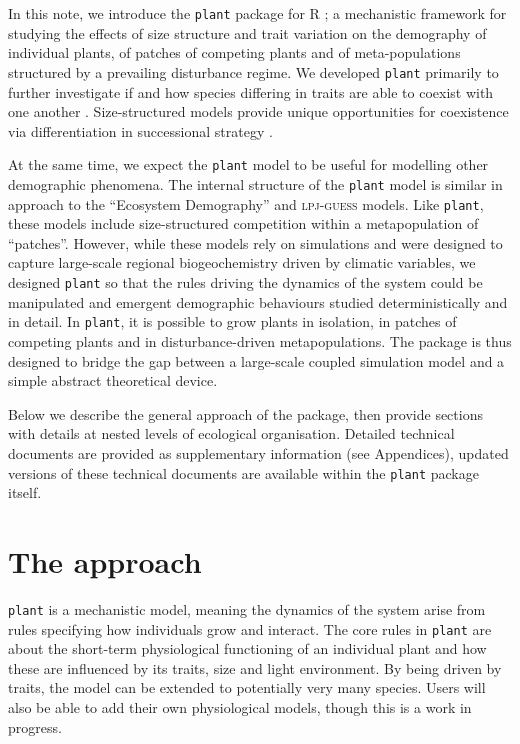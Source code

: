 \documentclass[a4paper,11pt]{article}
\newcommand{\plant}{\texttt{plant}}
\begin{document}
In this note, we introduce the {\plant} package for R \citep{R-2015};
a mechanistic framework for studying the effects of size structure and
trait variation on the demography of individual plants, of patches of
competing plants and of meta-populations structured by a prevailing
disturbance regime.
% 
We developed {\plant} primarily to further investigate if and how species
differing in traits are able to coexist with one another
\citep[following][]{Falster-2011,Falster-2015}.  Size-structured models
provide unique opportunities for coexistence via differentiation in
successional strategy \citep{Moorcroft-2001,Huston-1987}.

At the same time, we expect the {\plant} model to be useful for
modelling other demographic phenomena. The internal structure of the {\plant}
model is similar in approach to the ``Ecosystem Demography''
\citep{Moorcroft-2001} and \textsc{lpj-guess} \citep{Smith-2014}
models. Like {\plant}, these models include size-structured
competition within a metapopulation of ``patches''. However, while
these models rely on simulations and were designed to capture large-scale regional
biogeochemistry driven by climatic variables, we designed
{\plant} so that the rules driving the dynamics of the
system could be manipulated and emergent demographic behaviours
studied deterministically and in detail. In {\plant}, it is possible to grow plants in
isolation, in patches of competing plants and in disturbance-driven
metapopulations. The package is thus designed to bridge the gap between 
a large-scale coupled simulation model and a simple
abstract theoretical device. 

Below we describe the general approach of the package, then provide
sections with details at nested levels of ecological organisation.
Detailed technical documents are provided as supplementary information
(see Appendices), updated versions of these technical documents are
available within the {\plant} package itself.

\section{The approach}

{\plant} is a mechanistic model, meaning the dynamics of the system
arise from rules specifying how individuals grow and interact.  The
core rules in {\plant} are about the short-term physiological
functioning of an individual plant and how these are influenced by its
traits, size and light environment. By being driven by traits, the
model can be extended to potentially very many species. Users will
also be able to add their own physiological models, though this is a
work in progress.
\end{document}
